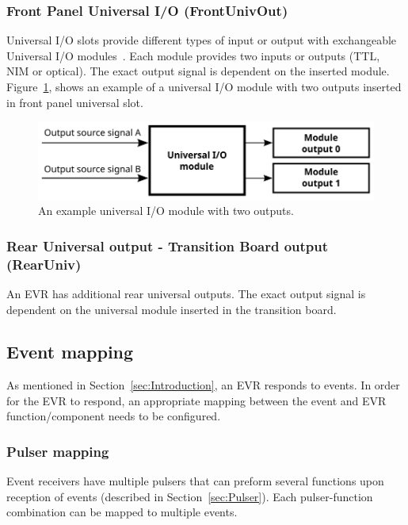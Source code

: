\documentclass[12pt,a4paper]{article}
\begin{document}
\subsubsection{Front Panel Universal I/O (FrontUnivOut)}\label{sec:Front Panel Universal I/O}
Universal I/O slots provide different types of input or output with exchangeable Universal I/O modules~\cite{mrf_modules}. Each module provides two inputs or outputs (TTL, NIM or optical). 
The exact output signal is dependent on the inserted module. Figure~\ref{fig:output_univ}, shows an example of a universal I/O module with two outputs inserted in front panel universal slot.
\begin{figure}[H]
	\centering
	\includegraphics[]{./img/univ}
	\caption{An example universal I/O module with two outputs.}
	\label{fig:output_univ}
\end{figure}

\subsubsection{Rear Universal output - Transition Board output (RearUniv)}\label{sec:Rear Universal output}
An EVR has additional rear universal outputs. The exact output signal is dependent on the universal module inserted in the transition board.

\subsection{Event mapping}\label{sec:Event mapping}
As mentioned in Section~\ref{sec:Introduction}, an EVR responds to events. In order for the EVR to respond, an appropriate mapping between the event and  EVR function/component needs to be configured.

\subsubsection{Pulser mapping}\label{sec:Pulser mapping}
Event receivers have multiple pulsers that can preform several functions upon reception of events (described in Section~\ref{sec:Pulser}). Each pulser-function combination can be
mapped to multiple events.
\end{document}
